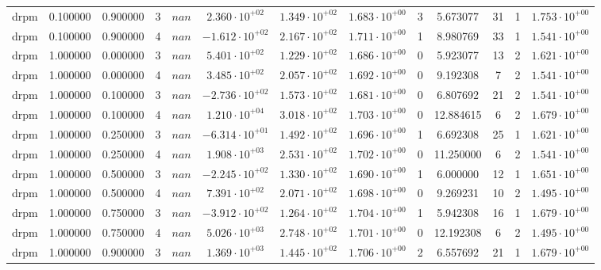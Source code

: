 \begin{table}
\begin{tabular}{ccccccccccccc}
drpm & 0.100000 & 0.900000 & 3 & $nan$ & $2.360 \cdot 10^{+02}$ & $1.349 \cdot 10^{+02}$ & $1.683 \cdot 10^{+00}$ & 3 & 5.673077 & 31 & 1 & $1.753 \cdot 10^{+00}$ \\
drpm & 0.100000 & 0.900000 & 4 & $nan$ & $-1.612 \cdot 10^{+02}$ & $2.167 \cdot 10^{+02}$ & $1.711 \cdot 10^{+00}$ & 1 & 8.980769 & 33 & 1 & $1.541 \cdot 10^{+00}$ \\
drpm & 1.000000 & 0.000000 & 3 & $nan$ & $5.401 \cdot 10^{+02}$ & $1.229 \cdot 10^{+02}$ & $1.686 \cdot 10^{+00}$ & 0 & 5.923077 & 13 & 2 & $1.621 \cdot 10^{+00}$ \\
drpm & 1.000000 & 0.000000 & 4 & $nan$ & $3.485 \cdot 10^{+02}$ & $2.057 \cdot 10^{+02}$ & $1.692 \cdot 10^{+00}$ & 0 & 9.192308 & 7 & 2 & $1.541 \cdot 10^{+00}$ \\
drpm & 1.000000 & 0.100000 & 3 & $nan$ & $-2.736 \cdot 10^{+02}$ & $1.573 \cdot 10^{+02}$ & $1.681 \cdot 10^{+00}$ & 0 & 6.807692 & 21 & 2 & $1.541 \cdot 10^{+00}$ \\
drpm & 1.000000 & 0.100000 & 4 & $nan$ & $1.210 \cdot 10^{+04}$ & $3.018 \cdot 10^{+02}$ & $1.703 \cdot 10^{+00}$ & 0 & 12.884615 & 6 & 2 & $1.679 \cdot 10^{+00}$ \\
drpm & 1.000000 & 0.250000 & 3 & $nan$ & $-6.314 \cdot 10^{+01}$ & $1.492 \cdot 10^{+02}$ & $1.696 \cdot 10^{+00}$ & 1 & 6.692308 & 25 & 1 & $1.621 \cdot 10^{+00}$ \\
drpm & 1.000000 & 0.250000 & 4 & $nan$ & $1.908 \cdot 10^{+03}$ & $2.531 \cdot 10^{+02}$ & $1.702 \cdot 10^{+00}$ & 0 & 11.250000 & 6 & 2 & $1.541 \cdot 10^{+00}$ \\
drpm & 1.000000 & 0.500000 & 3 & $nan$ & $-2.245 \cdot 10^{+02}$ & $1.330 \cdot 10^{+02}$ & $1.690 \cdot 10^{+00}$ & 1 & 6.000000 & 12 & 1 & $1.651 \cdot 10^{+00}$ \\
drpm & 1.000000 & 0.500000 & 4 & $nan$ & $7.391 \cdot 10^{+02}$ & $2.071 \cdot 10^{+02}$ & $1.698 \cdot 10^{+00}$ & 0 & 9.269231 & 10 & 2 & $1.495 \cdot 10^{+00}$ \\
drpm & 1.000000 & 0.750000 & 3 & $nan$ & $-3.912 \cdot 10^{+02}$ & $1.264 \cdot 10^{+02}$ & $1.704 \cdot 10^{+00}$ & 1 & 5.942308 & 16 & 1 & $1.679 \cdot 10^{+00}$ \\
drpm & 1.000000 & 0.750000 & 4 & $nan$ & $5.026 \cdot 10^{+03}$ & $2.748 \cdot 10^{+02}$ & $1.701 \cdot 10^{+00}$ & 0 & 12.192308 & 6 & 2 & $1.495 \cdot 10^{+00}$ \\
drpm & 1.000000 & 0.900000 & 3 & $nan$ & $1.369 \cdot 10^{+03}$ & $1.445 \cdot 10^{+02}$ & $1.706 \cdot 10^{+00}$ & 2 & 6.557692 & 21 & 1 & $1.679 \cdot 10^{+00}$ \\

\end{tabular}
\end{table}
